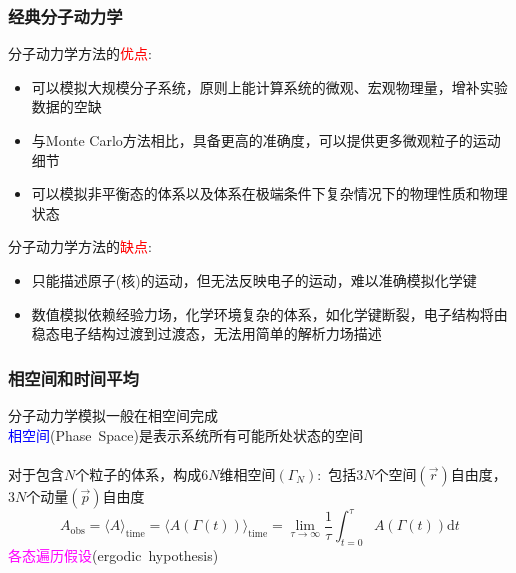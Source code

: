 \frame
{
	\frametitle{经典分子动力学}
	分子动力学方法的\textcolor{red}{优点}:
	\begin{itemize}
			\setlength{\itemsep}{5pt}
		\item 可以模拟大规模分子系统，原则上能计算系统的微观、宏观物理量，增补实验数据的空缺
		\item 与\textrm{Monte Carlo}方法相比，具备更高的准确度，可以提供更多微观粒子的运动细节
		\item 可以模拟非平衡态的体系以及体系在极端条件下复杂情况下的物理性质和物理状态
	\end{itemize}
	分子动力学方法的\textcolor{red}{缺点}:
	\begin{itemize}
			\setlength{\itemsep}{5pt}
		\item 只能描述原子(核)的运动，但无法反映电子的运动，难以准确模拟化学键
		\item 数值模拟依赖经验力场，化学环境复杂的体系，如化学键断裂，电子结构将由稳态电子结构过渡到过渡态，无法用简单的解析力场描述
	\end{itemize}
}

\frame
{
	\frametitle{相空间和时间平均}
	分子动力学模拟一般在相空间完成\\
	\vskip 3pt
	\textcolor{blue}{相空间}\textrm{(Phase~Space)}是表示系统所有可能所处状态的空间\\
	\vskip 5pt
{\fontsize{8.5pt}{6.2pt}}\\
	\vskip 8pt
	对于包含$N$个粒子的体系，构成$6N$维相空间$(\Gamma_N)$:~包括$3N$个空间$(\vec r)$自由度，$3N$个动量$(\vec p)$自由度
	\vskip 5pt
{\fontsize{8.2pt}{6.2pt}}
	\begin{displaymath}
		A_{\mathrm{obs}}=\langle A\rangle_{\mathrm{time}}=\langle A(\Gamma(t))\rangle_{\mathrm{time}}=\lim_{\tau\rightarrow\infty}\dfrac1{\tau}\int_{t=0}^{\tau}A(\Gamma(t))\mathrm{d}t
	\end{displaymath}
	\textcolor{magenta}{各态遍历假设}\textrm{(ergodic~hypothesis)}\\
	\vskip 5pt
{\fontsize{9.5pt}{6.2pt}}
}

